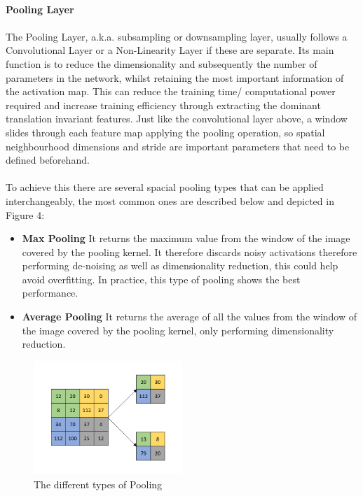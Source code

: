 \documentclass{article}
\begin{document}
\paragraph{Pooling Layer}
\paragraph{}
The Pooling Layer, a.k.a. subsampling or downsampling layer, usually follows a Convolutional Layer or a Non-Linearity Layer if these are separate. Its main function is to reduce the dimensionality and subsequently the number of parameters in the network, whilst retaining the most important information of the activation map. This can reduce the training time/ computational power required and increase training efficiency through extracting the dominant translation invariant features. Just like the convolutional layer above, a window slides through each feature map applying the pooling operation, so spatial neighbourhood dimensions and stride are important parameters that need to be defined beforehand.
\paragraph{}
To achieve this there are several spacial pooling types that can be applied interchangeably, the most common ones are described below and depicted in Figure 4:
\begin{itemize}
    \item \textbf{Max Pooling} It returns the maximum value from the window of the image covered by the pooling kernel. It therefore discards noisy activations therefore performing de-noising as well as dimensionality reduction, this could help avoid overfitting. In practice, this type of pooling shows the best performance.
    \item \textbf{Average Pooling} It returns the average of all the values from the window of the image covered by the pooling kernel, only performing dimensionality reduction.
\end{itemize}

    \begin{figure}[hbt!]
        \centering
        \includegraphics[width=0.5\textwidth]{pooling_diagram.png}
        \caption{The different types of Pooling}
    \end{figure}
\end{document}
